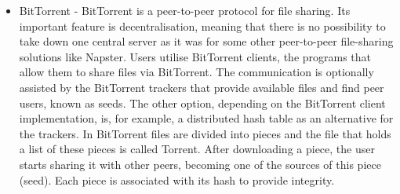\begin{itemize}
    \item BitTorrent - BitTorrent is a peer-to-peer protocol for file sharing. Its important feature is decentralisation, meaning that there is no possibility to take down one central server as it was for some other peer-to-peer file-sharing solutions like Napster. Users utilise BitTorrent clients, the programs that allow them to share files via BitTorrent. The communication is optionally assisted by the BitTorrent trackers that provide available files and find peer users, known as seeds. The other option, depending on the BitTorrent client implementation, is, for example, a distributed hash table as an alternative for the trackers. In BitTorrent files are divided into pieces and the file that holds a list of these pieces is called Torrent. After downloading a piece, the user starts sharing it with other peers, becoming one of the sources of this piece (seed). Each piece is associated with its hash to provide integrity.
\end{itemize}
